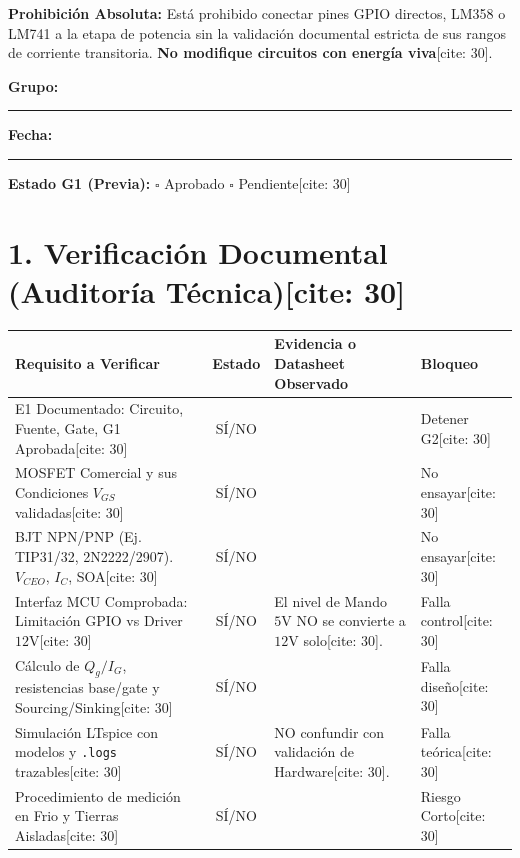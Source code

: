 \documentclass[10pt, a4paper, landscape]{article}
\begin{document}
\begin{tcolorbox}[colback=red!5, colframe=red!70!black, title=\textbf{G2 — Puerta Técnica y de Seguridad para Etapa BJT Buffer (Sin Energización)[cite: 30]}]
    \textbf{Prohibición Absoluta:} Está prohibido conectar pines GPIO directos, LM358 o LM741 a la etapa de potencia sin la validación documental estricta de sus rangos de corriente transitoria. \textbf{No modifique circuitos con energía viva}[cite: 30].
\end{tcolorbox}

\noindent \textbf{Grupo:} \rule{3cm}{0.15mm} \quad \textbf{Fecha:} \rule{2cm}{0.15mm} \quad \textbf{Estado G1 (Previa):} $\square$ Aprobado \quad $\square$ Pendiente[cite: 30]

\section*{1. Verificación Documental (Auditoría Técnica)[cite: 30]}
\renewcommand{\arraystretch}{1.5}
\begin{tabularx}{\textwidth}{|>{\raggedright\arraybackslash}p{6.5cm}|c|>{\raggedright\arraybackslash}X|p{2.5cm}|}
\hline
\rowcolor{gray!20}
\textbf{Requisito a Verificar} & \textbf{Estado} & \textbf{Evidencia o Datasheet Observado} & \textbf{Bloqueo} \\ \hline
E1 Documentado: Circuito, Fuente, Gate, G1 Aprobada[cite: 30] & SÍ/NO & & Detener G2[cite: 30] \\ \hline
MOSFET Comercial y sus Condiciones $V_{GS}$ validadas[cite: 30] & SÍ/NO & & No ensayar[cite: 30] \\ \hline
BJT NPN/PNP (Ej. TIP31/32, 2N2222/2907). $V_{CEO}$, $I_C$, SOA[cite: 30] & SÍ/NO & & No ensayar[cite: 30] \\ \hline
Interfaz MCU Comprobada: Limitación GPIO vs Driver $12\text{V}$[cite: 30] & SÍ/NO & El nivel de Mando $5\text{V}$ NO se convierte a $12\text{V}$ solo[cite: 30]. & Falla control[cite: 30] \\ \hline
Cálculo de $Q_g/I_G$, resistencias base/gate y Sourcing/Sinking[cite: 30] & SÍ/NO & & Falla diseño[cite: 30] \\ \hline
Simulación LTspice con modelos y \texttt{.logs} trazables[cite: 30] & SÍ/NO & NO confundir con validación de Hardware[cite: 30]. & Falla teórica[cite: 30] \\ \hline
Procedimiento de medición en Frio y Tierras Aisladas[cite: 30] & SÍ/NO & & Riesgo Corto[cite: 30] \\ \hline
\end{tabularx}
\end{document}
